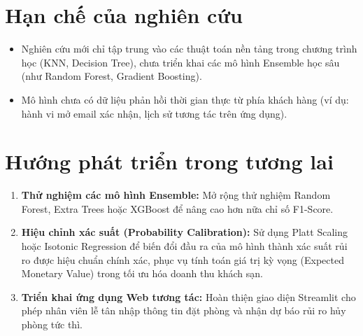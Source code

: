 \section{Hạn chế của nghiên cứu}
\begin{itemize}
    \item Nghiên cứu mới chỉ tập trung vào các thuật toán nền tảng trong chương trình học (KNN, Decision Tree), chưa triển khai các mô hình Ensemble học sâu (như Random Forest, Gradient Boosting).
    \item Mô hình chưa có dữ liệu phản hồi thời gian thực từ phía khách hàng (ví dụ: hành vi mở email xác nhận, lịch sử tương tác trên ứng dụng).
\end{itemize}

\section{Hướng phát triển trong tương lai}
\begin{enumerate}
    \item \textbf{Thử nghiệm các mô hình Ensemble:} Mở rộng thử nghiệm Random Forest, Extra Trees hoặc XGBoost để nâng cao hơn nữa chỉ số F1-Score.
    \item \textbf{Hiệu chỉnh xác suất (Probability Calibration):} Sử dụng Platt Scaling hoặc Isotonic Regression để biến đổi đầu ra của mô hình thành xác suất rủi ro được hiệu chuẩn chính xác, phục vụ tính toán giá trị kỳ vọng (Expected Monetary Value) trong tối ưu hóa doanh thu khách sạn.
    \item \textbf{Triển khai ứng dụng Web tương tác:} Hoàn thiện giao diện Streamlit cho phép nhân viên lễ tân nhập thông tin đặt phòng và nhận dự báo rủi ro hủy phòng tức thì.
\end{enumerate}

